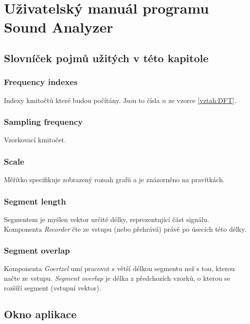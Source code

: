 \chapter{Uživatelský manuál programu Sound Analyzer}


\section{Slovníček pojmů užitých v této kapitole}

\subsection{Frequency indexes}

Indexy kmitočtů které budou počítány. Jsou to čísla $n$ ze vzorce \ref{vztah:DFT}.


\subsection{Sampling frequency}

Vzorkovací kmitočet.

\subsection{Scale}

Měřítko specifikuje zobrazený rozsah grafů a je znázorněno na pravítkách.

\subsection{Segment length}
\label{sec:segmentlegth}

Segmentem je myšlen vektor určité délky, reprezentující část signálu. Komponenta \emph{Recorder} čte ze vstupu (nebo přehrává) právě po úsecích této délky.

\subsection{Segment overlap}
\label{sec:segmentoverlap}

Komponenta \emph{Goertzel} umí pracovat s větší délkou segmentu než s tou, kterou načte ze vstupu. \emph{Segment overlap} je délka z předchozích vzorků, o kterou se rozšíří segment (vstupní vektor).


\section{Okno aplikace}

